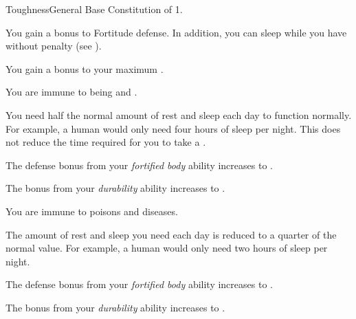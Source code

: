     \begin{feat}{Toughness}{General}
        \featpre Base Constitution of 1.

         You gain a  bonus to Fortitude defense.
        In addition, you can sleep while you have  without penalty (see ).

         You gain a  bonus to your maximum .

         You are immune to being  and .

         You need half the normal amount of rest and sleep each day to function normally.
        For example, a human would only need four hours of sleep per night.
        This does not reduce the time required for you to take a .

         The defense bonus from your \textit{fortified body} ability increases to .

         The bonus from your \textit{durability} ability increases to .

         You are immune to poisons and diseases.

         The amount of rest and sleep you need each day is reduced to a quarter of the normal value.
        For example, a human would only need two hours of sleep per night.

         The defense bonus from your \textit{fortified body} ability increases to .

         The bonus from your \textit{durability} ability increases to .
    \end{feat}

